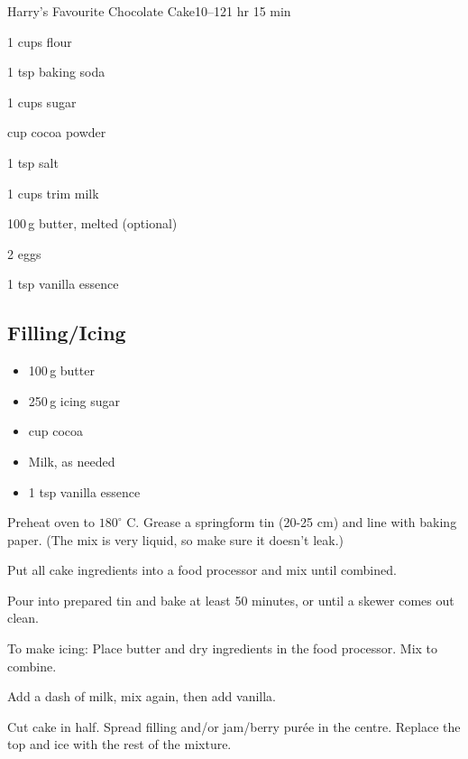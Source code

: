 \begin{recipebox}{Harry’s Favourite Chocolate Cake}{10--12}{1 hr 15 min}
  \begin{ingredients}
    \item 1 cups flour
    \item 1 tsp baking soda
    \item 1 cups sugar
    \item {} cup cocoa powder
    \item 1 tsp salt
    \item 1 cups trim milk
    \item 100\,g butter, melted (optional)
    \item 2 eggs
    \item 1 tsp vanilla essence
  \end{ingredients}

  \subsection*{Filling/Icing}
  \begin{itemize}[leftmargin=2em]
    \item 100\,g butter
    \item 250\,g icing sugar
    \item {} cup cocoa
    \item Milk, as needed
    \item 1 tsp vanilla essence
  \end{itemize}

  \begin{method}
    \item Preheat oven to $180^\circ$ C. Grease a springform tin (20-25 cm) and line with baking paper. (The mix is very liquid, so make sure it doesn’t leak.)
    \item Put all cake ingredients into a food processor and mix until combined.
    \item Pour into prepared tin and bake at least 50 minutes, or until a skewer comes out clean.
    \item To make icing: Place butter and dry ingredients in the food processor. Mix to combine.
    \item Add a dash of milk, mix again, then add vanilla.
    \item Cut cake in half. Spread filling and/or jam/berry purée in the centre. Replace the top and ice with the rest of the mixture.
  \end{method}
\end{recipebox}
